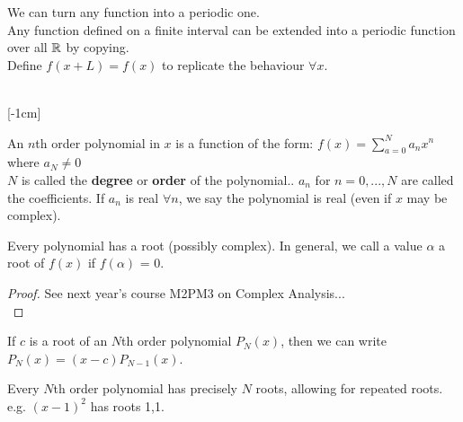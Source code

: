 
We can turn any function into a periodic one.\\
Any function defined on a finite interval can be extended into a periodic function over all $\mathbb{R}$ by copying.\\

Define $f(x + L) = f(x)$ to replicate the behaviour $\forall x$.\\\\


\pagebreak

 [-1cm]
\vspace*{-5pt}
\begin{Definition} \begin{shaded}
An $n$th order polynomial in $x$ is a function of the form: $f(x) = \displaystyle{\sum_{a=0}^{N} a_n x^n}$ where $a_N \neq 0$\\
$N$ is called the \textbf{degree} or \textbf{order} of the polynomial.. $a_n$ for $n = 0,...,N$ are called the coefficients. If $a_n$ is real $\forall n$, we say the polynomial is real (even if $x$ may be complex).\end{shaded}
\end{Definition}

\begin{theorem}

Every polynomial has a root (possibly complex). In general, we call a value $\alpha$ a root of $f(x)$ if $f(\alpha)$ = 0. 

\end{theorem}

\begin{proof}\renewcommand{\qedsymbol}{}
See next year's course M2PM3 on Complex Analysis...\\
\end{proof}

\begin{corollary}
If $c$ is a root of an $N$th order polynomial $P_N(x)$, then we can write $P_N(x) = (x-c)P_{N-1}(x)$.
\end{corollary}

\begin{corollary}
Every $N$th order polynomial has precisely $N$ roots, allowing for repeated roots. e.g. $(x-1)^2$ has roots 1,1.
\end{corollary}

